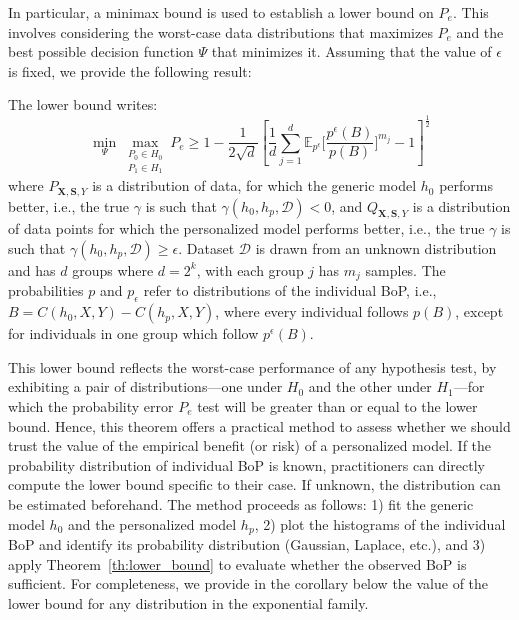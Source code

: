 In particular, a minimax bound is used to establish a lower bound on $P_e$. This involves considering the worst-case data distributions that maximizes $P_e$ and the best possible decision function $\Psi$ that minimizes it. Assuming that the value of $\epsilon$ is fixed, we provide the following result: 
\begin{theorem}\label{th:lower_bound}
The lower bound writes:
\begin{equation} \label{eq:lower_bound}
    \min _{\Psi} 
    \max _{\substack{P_0 \in H_0 \\ P_1 \in H_1}}
        P_e 
        \geq 1 - \frac{1}{2\sqrt{d}}\left[
             \frac{1}{d}
            \sum_{j=1}^d \mathbb{E}_{p^\epsilon}\Bigg[
           \frac{p^{\epsilon}(B)}{p(B)}\Bigg]^{m_j}
            -1
            \right]^{\frac{1}{2}}
\end{equation}
where $P_{\mathbf{X}, \mathbf{S}, Y}$ is a distribution of data, for which the generic model $h_0$ performs better, i.e., the true $\gamma$ is such that $\gamma(h_0, h_p, \mathcal{D}) < 0$, and $Q_{\mathbf{X}, \mathbf{S}, Y}$ is a distribution of data points for which the personalized model performs better, i.e., the true $\gamma$ is such that $\gamma(h_0, h_p, \mathcal{D}) \geq \epsilon$. Dataset $\mathcal{D}$ is drawn from an unknown distribution and has $d$ groups where $d=2^k$, with each group $j$ has $m_j$ samples. The probabilities $p$ and $p_\epsilon$ refer to distributions of the individual BoP, i.e., $B=C(h_0, X, Y) - C(h_p, X, Y)$, where every individual follows $p(B)$, except for individuals in one group which follow $p^\epsilon(B)$.
\end{theorem}

This lower bound reflects the worst-case performance of any hypothesis test, by exhibiting a pair of distributions—one under \( H_0 \) and the other under \( H_1 \)—for which the probability error $P_e$ test will be greater than or equal to the lower bound. Hence, this theorem offers a practical method to assess whether we should trust the value of the empirical benefit (or risk) of a personalized model. If the probability distribution of individual BoP is known, practitioners can directly compute the lower bound specific to their case. If unknown, the distribution can be estimated beforehand. The method proceeds as follows: 1) fit the generic model $h_0$ and the personalized model $h_p$, 2) plot the histograms of the individual BoP and identify its probability distribution (Gaussian, Laplace, etc.), and 3) apply Theorem~\ref{th:lower_bound} to evaluate whether the observed BoP is sufficient. For completeness, we provide in the corollary below the value of the lower bound for any distribution in the exponential family.

